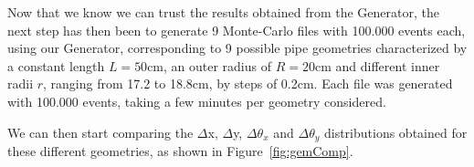 \documentclass[a4paper, 11pt]{report}
\begin{document}
Now that we know we can trust the results obtained from the Generator, the next step has then been to generate 9 Monte-Carlo files with 100.000 events each, using our Generator, corresponding to 9 possible pipe geometries characterized by a constant length $L = 50$cm, an outer radius of $R = 20$cm and different inner radii $r$, ranging from 17.2 to 18.8cm, by steps of 0.2cm. Each file was generated with 100.000 events, taking a few minutes per geometry considered.

We can then start comparing the $\Delta$x, $\Delta$y, $\Delta \theta_x$ and $\Delta \theta_y$ distributions obtained for these different geometries, as shown in Figure~\ref{fig:gemComp}.

\begin{figure}[htbp]
\centering
{}
\end{figure}
\end{document}
